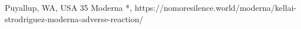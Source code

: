           {Puyallup, WA, USA}
          {35}
          {Moderna}
          {*, }
          {}
          {https://nomoresilence.world/moderna/kellai-strodriguez-moderna-adverse-reaction/}

